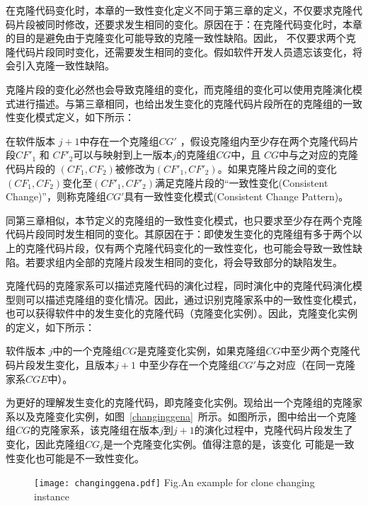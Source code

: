 在克隆代码变化时，本章的一致性变化定义不同于第三章的定义，不仅要求克隆代码片段被同时修改，还要求发生相同的变化。原因在于：在克隆代码变化时，本章的目的是避免由于克隆变化可能导致的克隆一致性缺陷。因此， 不仅要求两个克隆代码片段同时变化，还需要发生相同的变化。假如软件开发人员遗忘该变化，将会引入克隆一致性缺陷。

克隆片段的变化必然也会导致克隆组的变化，而克隆组的变化可以使用克隆演化模式进行描述。与第三章相同，也给出发生变化的克隆代码片段所在的克隆组的一致性变化模式定义，如下所示：

\begin{definition}[变化时一致性变化模式] 
\label{def-changingpattern}
在软件版本 $j+1$中存在一个克隆组$CG'$ ，假设克隆组内至少存在两个克隆代码片段$CF'_1$ 和 $CF'_2$可以与映射到上一版本$j$的克隆组$CG$中，且 $CG$中与之对应的克隆代码片段的 $(CF_1,CF_2)$被修改为$(CF'_1,CF'_2)$。如果克隆片段之间的变化$(CF_1,CF_2)$变化至$(CF'_1,CF'_2)$满足克隆片段的“一致性变化(Consistent Change)”，则称克隆组$CG'$具有一致性变化模式(Consistent Change Pattern)。
\end{definition}

同第三章相似，本节定义的克隆组的一致性变化模式，也只要求至少存在两个克隆代码片段同时发生相同的变化。其原因在于：即使发生变化的克隆组有多于两个以上的克隆代码片段，仅有两个克隆代码变化的一致性变化，也可能会导致一致性缺陷。若要求组内全部的克隆片段发生相同的变化，将会导致部分的缺陷发生。

克隆代码的克隆家系可以描述克隆代码的演化过程，同时演化中的克隆代码演化模型则可以描述克隆组的变化情况。因此，通过识别克隆家系中的一致性变化模式，也可以获得软件中的发生变化的克隆代码（克隆变化实例）。因此，克隆变化实例的定义，如下所示：

\begin{definition}[克隆变化实例] 
\label{def-changinginstance}
软件版本 $j$中的一个克隆组$CG$是克隆变化实例，如果克隆组$CG$中至少两个克隆代码片段发生变化，且版本$j+1$ 中至少存在一个克隆组$CG'$与之对应（在同一克隆家系$CGE$中）。 
\end{definition}

为更好的理解发生变化的克隆代码，即克隆变化实例。现给出一个克隆组的克隆家系以及克隆变化实例，如图~\ref{changinggena}~所示。如图所示，图中给出一个克隆组$CG$的克隆家系，该克隆组在版本$j$到$j+1$的演化过程中，克隆代码片段发生了变化，因此克隆组$CG_j$是一个克隆变化实例。值得注意的是，该变化 可能是一致性变化也可能是不一致性变化。

\begin{figure}[htbp]
\centering
\texttt{[image: changinggena.pdf]}
{Fig.$\!$}{An example for clone changing instance}
\vspace{-1em}
\end{figure}

